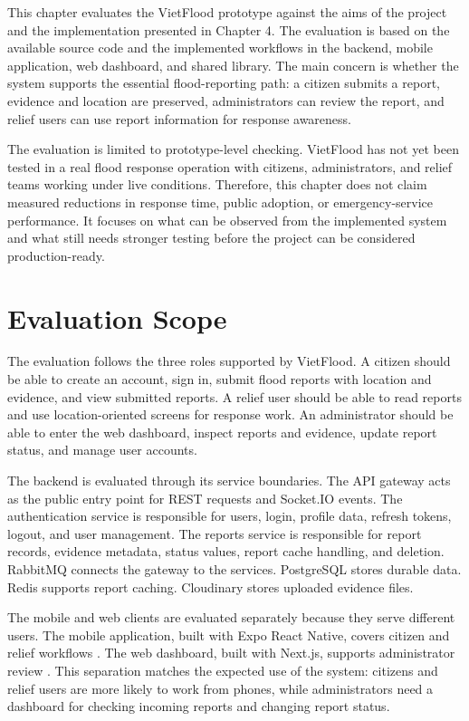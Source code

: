 This chapter evaluates the VietFlood prototype against the aims of the project and the implementation presented in Chapter 4. The evaluation is based on the available source code and the implemented workflows in the backend, mobile application, web dashboard, and shared library. The main concern is whether the system supports the essential flood-reporting path: a citizen submits a report, evidence and location are preserved, administrators can review the report, and relief users can use report information for response awareness.

The evaluation is limited to prototype-level checking. VietFlood has not yet been tested in a real flood response operation with citizens, administrators, and relief teams working under live conditions. Therefore, this chapter does not claim measured reductions in response time, public adoption, or emergency-service performance. It focuses on what can be observed from the implemented system and what still needs stronger testing before the project can be considered production-ready.

\section{Evaluation Scope}

The evaluation follows the three roles supported by VietFlood. A citizen should be able to create an account, sign in, submit flood reports with location and evidence, and view submitted reports. A relief user should be able to read reports and use location-oriented screens for response work. An administrator should be able to enter the web dashboard, inspect reports and evidence, update report status, and manage user accounts.

The backend is evaluated through its service boundaries. The API gateway acts as the public entry point for REST requests and Socket.IO events. The authentication service is responsible for users, login, profile data, refresh tokens, logout, and user management. The reports service is responsible for report records, evidence metadata, status values, report cache handling, and deletion. RabbitMQ connects the gateway to the services. PostgreSQL stores durable data. Redis supports report caching. Cloudinary stores uploaded evidence files.

The mobile and web clients are evaluated separately because they serve different users. The mobile application, built with Expo React Native, covers citizen and relief workflows \cite{expoDocs,reactNativeDocs}. The web dashboard, built with Next.js, supports administrator review \cite{nextjsDocs}. This separation matches the expected use of the system: citizens and relief users are more likely to work from phones, while administrators need a dashboard for checking incoming reports and changing report status.

